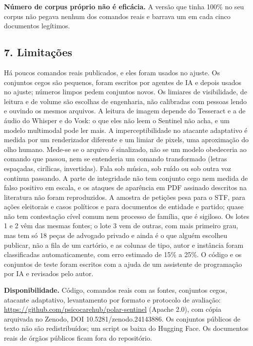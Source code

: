 \documentclass[
  brazilian,
  11pt,
]{article}
\begin{document}
\textbf{Número de corpus próprio não é eficácia.} A versão que tinha
100\% no seu corpus não pegava nenhum dos comandos reais e barrava um em
cada cinco documentos legítimos.

\subsection{7. Limitações}\label{limitauxe7uxf5es}

Há poucos comandos reais publicados, e eles foram usados no ajuste. Os
conjuntos cegos são pequenos, foram escritos por agentes de IA e depois
usados no ajuste; números limpos pedem conjuntos novos. Os limiares de
visibilidade, de leitura e de volume são escolhas de engenharia, não
calibradas com pessoas lendo e ouvindo os mesmos arquivos. A leitura de
imagem depende do Tesseract e a de áudio do Whisper e do Vosk: o que
eles não leem o Sentinel não acha, e um modelo multimodal pode ler mais.
A imperceptibilidade no atacante adaptativo é medida por um renderizador
diferente e um limiar de pixels, uma aproximação do olho humano. Mede-se
se o arquivo é sinalizado, não se um modelo obedeceria ao comando que
passou, nem se entenderia um comando transformado (letras espaçadas,
cirílicas, invertidas). Fala sob música, sob ruído ou sob outra voz
continua passando. A parte de integridade não tem conjunto cego nem
medida de falso positivo em escala, e os ataques de aparência em PDF
assinado descritos na literatura não foram reproduzidos. A amostra de
petições pesa para o STF, para ações eleitorais e casos políticos e para
documentos de entidade e partido; quase não tem contestação cível comum
nem processo de família, que é sigiloso. Os lotes 1 e 2 vêm das mesmas
fontes; o lote 3 vem de outras, com mais primeiro grau, mas tem só 18
peças de advogado privado e ainda é o que alguém escolheu publicar, não
a fila de um cartório, e as colunas de tipo, autor e instância foram
classificadas automaticamente, com erro estimado de 15\% a 25\%. O
código e os conjuntos de teste foram escritos com a ajuda de um
assistente de programação por IA e revisados pelo autor.

\textbf{Disponibilidade.} Código, comandos reais com as fontes,
conjuntos cegos, atacante adaptativo, levantamento por formato e
protocolo de avaliação:
\url{https://github.com/psicocarehub/polar-sentinel} (Apache 2.0), com
cópia arquivada no Zenodo, DOI 10.5281/zenodo.24143886. Os conjuntos
públicos de texto não são redistribuídos; um script os baixa do Hugging
Face. Os documentos reais de órgãos públicos ficam fora do repositório.
\end{document}

